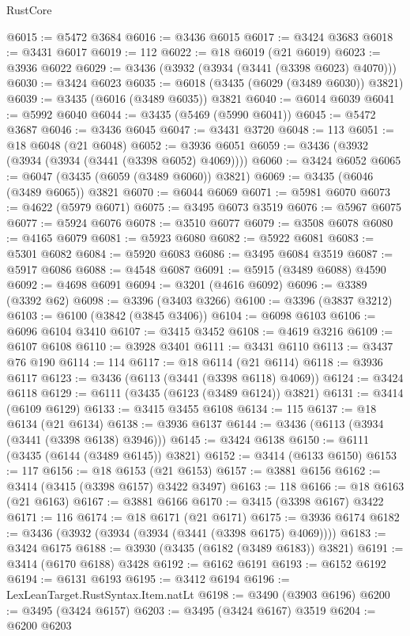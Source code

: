 \begin{lexlean}{RustCore}
\begin{coremodule}
@6015 := @5472 @3684
@6016 := @3436 @6015
@6017 := @3424 @3683
@6018 := @3431 @6017
@6019 := 112
@6022 := @18 @6019 (@21 @6019)
@6023 := @3936 @6022
@6029 := @3436 (@3932 (@3934 (@3441 (@3398 @6023) @4070)))
@6030 := @3424 @6023
@6035 := @6018 (@3435 (@6029 (@3489 @6030)) @3821)
@6039 := @3435 (@6016 (@3489 @6035)) @3821
@6040 := @6014 @6039
@6041 := @5992 @6040
@6044 := @3435 (@5469 (@5990 @6041))
@6045 := @5472 @3687
@6046 := @3436 @6045
@6047 := @3431 @3720
@6048 := 113
@6051 := @18 @6048 (@21 @6048)
@6052 := @3936 @6051
@6059 := @3436 (@3932 (@3934 (@3934 (@3441 (@3398 @6052) @4069))))
@6060 := @3424 @6052
@6065 := @6047 (@3435 (@6059 (@3489 @6060)) @3821)
@6069 := @3435 (@6046 (@3489 @6065)) @3821
@6070 := @6044 @6069
@6071 := @5981 @6070
@6073 := @4622 (@5979 @6071)
@6075 := @3495 @6073 @3519
@6076 := @5967 @6075
@6077 := @5924 @6076
@6078 := @3510 @6077
@6079 := @3508 @6078
@6080 := @4165 @6079
@6081 := @5923 @6080
@6082 := @5922 @6081
@6083 := @5301 @6082
@6084 := @5920 @6083
@6086 := @3495 @6084 @3519
@6087 := @5917 @6086
@6088 := @4548 @6087
@6091 := @5915 (@3489 @6088) @4590
@6092 := @4698 @6091
@6094 := @3201 (@4616 @6092)
@6096 := @3389 (@3392 @62)
@6098 := @3396 (@3403 @3266)
@6100 := @3396 (@3837 @3212)
@6103 := @6100 (@3842 (@3845 @3406))
@6104 := @6098 @6103
@6106 := @6096 @6104 @3410
@6107 := @3415 @3452
@6108 := @4619 @3216
@6109 := @6107 @6108
@6110 := @3928 @3401
@6111 := @3431 @6110
@6113 := @3437 @76 @190
@6114 := 114
@6117 := @18 @6114 (@21 @6114)
@6118 := @3936 @6117
@6123 := @3436 (@6113 (@3441 (@3398 @6118) @4069))
@6124 := @3424 @6118
@6129 := @6111 (@3435 (@6123 (@3489 @6124)) @3821)
@6131 := @3414 (@6109 @6129)
@6133 := @3415 @3455 @6108
@6134 := 115
@6137 := @18 @6134 (@21 @6134)
@6138 := @3936 @6137
@6144 := @3436 (@6113 (@3934 (@3441 (@3398 @6138) @3946)))
@6145 := @3424 @6138
@6150 := @6111 (@3435 (@6144 (@3489 @6145)) @3821)
@6152 := @3414 (@6133 @6150)
@6153 := 117
@6156 := @18 @6153 (@21 @6153)
@6157 := @3881 @6156
@6162 := @3414 (@3415 (@3398 @6157) @3422 @3497)
@6163 := 118
@6166 := @18 @6163 (@21 @6163)
@6167 := @3881 @6166
@6170 := @3415 (@3398 @6167) @3422
@6171 := 116
@6174 := @18 @6171 (@21 @6171)
@6175 := @3936 @6174
@6182 := @3436 (@3932 (@3934 (@3934 (@3441 (@3398 @6175) @4069))))
@6183 := @3424 @6175
@6188 := @3930 (@3435 (@6182 (@3489 @6183)) @3821)
@6191 := @3414 (@6170 @6188) @3428
@6192 := @6162 @6191
@6193 := @6152 @6192
@6194 := @6131 @6193
@6195 := @3412 @6194
@6196 := LexLeanTarget.RustSyntax.Item.natLt
@6198 := @3490 (@3903 @6196)
@6200 := @3495 (@3424 @6157)
@6203 := @3495 (@3424 @6167) @3519
@6204 := @6200 @6203

\end{coremodule}
\end{lexlean}
